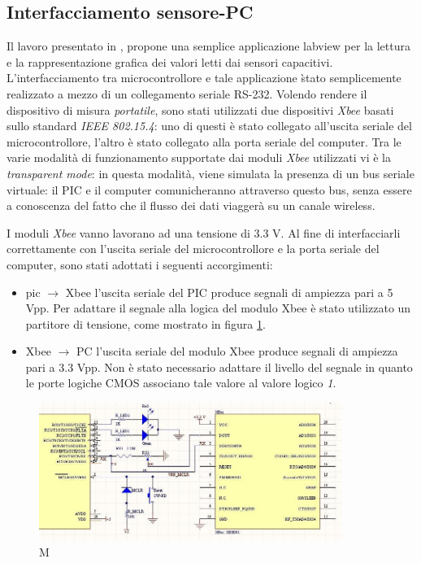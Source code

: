 \documentclass[12pt,a4paper,oneside,openright,italian]{article}
\begin{document}
\subsection{Interfacciamento sensore-PC}
Il lavoro presentato in \cite{trovato1}, propone una semplice applicazione labview per la lettura e la rappresentazione grafica dei valori letti dai sensori capacitivi. L'interfacciamento tra microcontrollore e tale applicazione \` stato semplicemente realizzato a mezzo di un collegamento seriale RS-232. Volendo rendere il dispositivo di misura \emph{portatile}, sono stati utilizzati due dispositivi \emph{Xbee}\cite{xbee_datasheet} basati sullo standard \emph{IEEE 802.15.4}: uno di questi \`e stato collegato all'uscita seriale del microcontrollore, l'altro \`e stato collegato alla porta seriale del computer. Tra le varie modalit\`a di funzionamento supportate dai moduli \emph{Xbee} utilizzati vi \`e la \emph{transparent mode}: in questa modalit\`a, viene simulata la presenza di un bus seriale virtuale: il PIC e il computer comunicheranno attraverso questo bus, senza essere a conoscenza del fatto che il flusso dei dati viagger\`a su un canale wireless.

I moduli \emph{Xbee} vanno lavorano ad una tensione di 3.3 V. Al fine di interfacciarli correttamente con l'uscita seriale del microcontrollore e la porta seriale del computer, sono stati adottati i seguenti accorgimenti:
\begin{itemize}
\item pic $\rightarrow$ Xbee
  l'uscita seriale del PIC produce segnali di ampiezza pari a 5 Vpp. Per adattare il segnale alla logica del modulo Xbee \`e stato utilizzato un partitore di tensione, come mostrato in figura \ref{partitore}.

\item Xbee $\rightarrow$ PC
  l'uscita seriale del modulo Xbee produce segnali di ampiezza pari a 3.3 Vpp. Non \`e stato necessario adattare il livello del segnale in quanto le porte logiche CMOS associano tale valore al valore logico \emph{1}.
\end{itemize}

\begin{figure}[!hbp]
  \centering
  \includegraphics[width=280pt]{immagini/connessionepicxbee.jpg}
  \caption{M}
  \label{partitore}
\end{figure}
\end{document}
